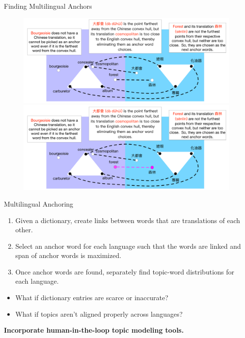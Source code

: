 \begin{frame}{Finding Multilingual Anchors}
\begin{figure}
\begin{overprint}
 \centerline{\includegraphics[width=\textwidth]{topic_models/mtanchor/multi_anchors5.pdf}}
 \centerline{\includegraphics[width=\textwidth]{topic_models/mtanchor/multi_anchors6.pdf}}
\end{overprint}
\end{figure}
\end{frame}

\begin{frame}{Multilingual Anchoring}
\begin{enumerate}
\item Given a dictionary, create links between words that are translations of each other.
\item Select an anchor word for each language such that the words are linked and span of anchor words is maximized.
\item Once anchor words are found, separately find topic-word distributions for each language.
\end{enumerate}
\end{frame}

\begin{frame}
\begin{itemize}
\item What if dictionary entries are scarce or inaccurate? 
\item What if topics aren't aligned properly across languages?
\end{itemize}
\pause 
\vspace{1cm}
\textbf{Incorporate human-in-the-loop topic modeling tools.}
\end{frame}

